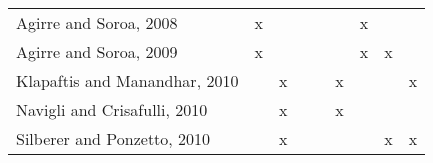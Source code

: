 \begin{table}[]
\begin{tabular}{l|cccc|cccc}
Agirre and Soroa, 2008 \cite{2008.Agirre.Multilingual}                           & x                                  &                                   &                                     &                                         &                                                                                  & x                                      &                                                 &                                                                                      \\
Agirre and Soroa, 2009 \cite{2009.Agirre.PersonalizedPageRankWSD}                & x                                  &                                   &                                     &                                         &                                                                                  & x                                      & x                                               &                                                                                      \\
Klapaftis and Manandhar, 2010 \cite{2010.Klapaftis.WSD.WSD.HierarchicalGraphs}   &                                    & x                                 &                                     &                                         & x                                                                                &                                        &                                                 & x                                                                                    \\
Navigli and Crisafulli, 2010 \cite{2010.Navigli.InducingWordSenses.Triangles}    &                                    & x                                 &                                     &                                         & x                                                                                &                                        &                                                 &                                                                                      \\
Silberer and Ponzetto, 2010 \cite{2010.Siberer.GraphCooccurrenceWSD}             &                                    & x                                 &                                     &                                         &                                                                                  &                                        & x                                               & x                                                                                    \\

\end{tabular}
\end{table}
